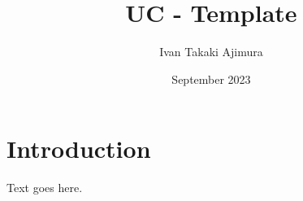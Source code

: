 \documentclass{uc-mse}
\title{UC - Template}
\author{Ivan Takaki Ajimura}
\date{September 2023}
\begin{document}
\maketitle

\section{Introduction}
Text goes here.
\textbf{}
\end{document}
